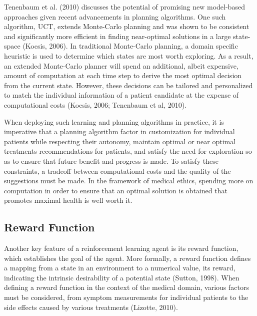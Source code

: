 \documentclass[]{spie}  %
\begin{document}
Tenenbaum et al. (2010) discusses the potential of promising new model-based approaches given recent advancements in planning algorithms. One such algorithm, UCT, extends Monte-Carlo planning and was shown to be consistent and significantly more efficient in finding near-optimal solutions in a large state-space (Kocsis, 2006). In traditional Monte-Carlo planning, a domain specific heuristic is used to determine which states are most worth exploring. As a result, an extended Monte-Carlo planner will spend an additional, albeit expensive, amount of computation at each time step to derive the most optimal decision from the current state. However, these decisions can be tailored and personalized to match the individual information of a patient candidate at the expense of computational costs (Kocsis, 2006; Tenenbaum et al, 2010).

When deploying such learning and planning algorithms in practice, it is imperative that a planning algorithm factor in customization for individual patients while respecting their autonomy, maintain optimal or near optimal treatments recommendations for patients, and satisfy the need for exploration so as to ensure that future benefit and progress is made. To satisfy these constraints, a tradeoff between computational costs and the quality of the suggestions must be made. In the framework of medical ethics, spending more on computation in order to ensure that an optimal solution is obtained that promotes maximal health is well worth it.


\subsection{Reward Function}
\label{sec:reward}

Another key feature of a reinforcement learning agent is its reward function, which establishes the goal of the agent. More formally, a reward function defines a mapping from a state in an environment to a numerical value, its reward, indicating the intrinsic desirability of a potential state (Sutton, 1998). When defining a reward function in the context of the medical domain, various factors must be considered, from symptom measurements for individual patients to the side effects caused by various treatments (Lizotte, 2010).
\end{document}
